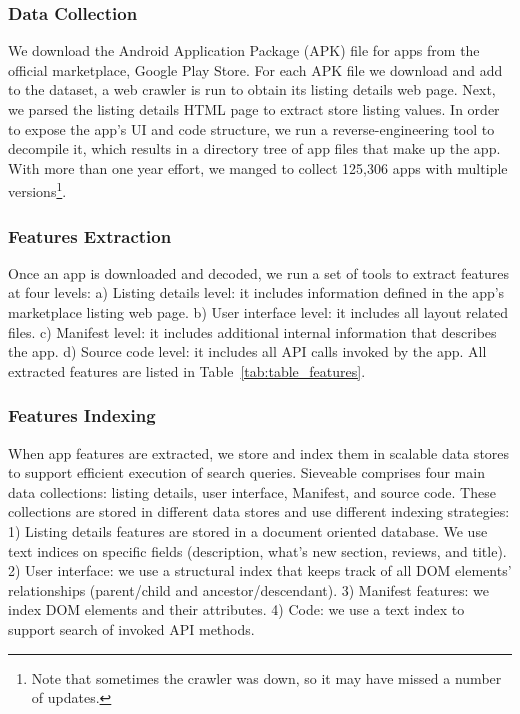 \subsubsection{Data Collection}
We download the Android Application Package (APK) file for apps from the official marketplace, Google Play Store.
For each APK file we download and add to the dataset, a web crawler is run to obtain its listing details web page.
Next, we parsed the listing details HTML page to extract store listing values.
In order to expose the app's UI and code structure, we run a reverse-engineering tool to decompile it, which results in a directory tree of app files that make up the app. 
With more than one year effort, we manged to collect 125,306 apps with multiple versions\footnote{Note that sometimes the crawler was down, so it may have missed a number of updates.}.

\subsubsection{Features Extraction}
Once an app is downloaded and decoded, we run a set of tools to extract features at four levels:
a) Listing details level: it includes information defined in the app's marketplace listing web page.
b) User interface level: it includes all layout related files.
c) Manifest level: it includes additional internal information that describes the app.
d) Source code level: it includes all API calls invoked by the app.
All extracted features are listed in Table~\ref{tab:table_features}.

\subsubsection{Features Indexing}
When app features are extracted, we store and index them in scalable data stores to support efficient execution of search queries.
Sieveable comprises four main data collections: listing details, user interface, Manifest, and source code.
These collections are stored in different data stores and use different indexing strategies:
1) Listing details features are stored in a document oriented database.
We use text indices on specific fields (description, what's new section, reviews, and title).
2) User interface: we use a structural index that keeps track of all DOM elements' relationships (parent/child and ancestor/descendant).
3) Manifest features: we index DOM elements and their attributes.
4) Code: we use a text index to support search of invoked API methods.

